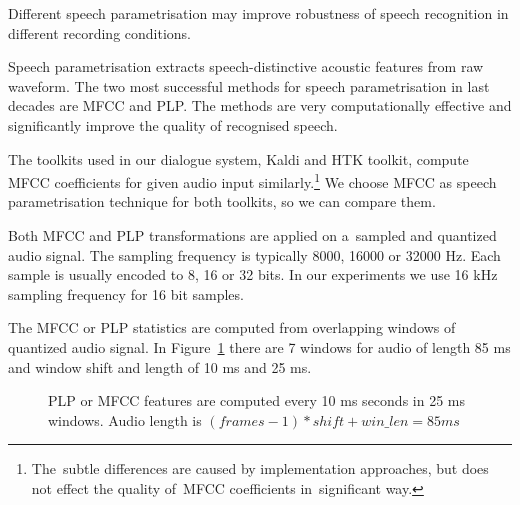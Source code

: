 Different speech parametrisation may improve robustness of speech recognition in different recording conditions.

Speech parametrisation extracts speech-distinctive acoustic features from raw waveform.
The two most successful methods for speech parametrisation in last decades are \ac{MFCC}\cite{davis1980comparison} and \ac{PLP}\cite{hermansky1990perceptual}.
The methods are very computationally effective and significantly improve the quality of recognised speech.


The toolkits used in our dialogue system, Kaldi and \ac{HTK} toolkit, compute \ac{MFCC} coefficients for given audio input similarly.\footnote{The~subtle differences are caused by implementation approaches, but does not effect the quality of~\ac{MFCC} coefficients in~significant way.}
We choose \ac{MFCC} as speech parametrisation technique for both toolkits, so we can compare them.

Both \ac{MFCC} and \ac{PLP} transformations are applied on a~sampled and quantized audio signal.
The sampling frequency is typically 8000, 16000 or 32000 Hz.
Each sample is usually encoded to 8, 16 or 32 bits. 
In our experiments we use 16 kHz sampling frequency for 16 bit samples.  

The \ac{MFCC} or \ac{PLP} statistics are computed from overlapping windows of quantized audio signal.
In Figure~\ref{fig:mfcc_window} there are 7 windows for audio of length 85 ms and window shift and length of 10 ms and 25 ms.

\begin{figure}[!htp]
    \begin{center}
    
    \caption{\ac{PLP} or \ac{MFCC} features are computed every 10 ms seconds in 25 ms windows.
    Audio length is $(frames-1)*shift + win\_len = 85ms$}
    \label{fig:mfcc_window} 
    \end{center}
\end{figure}


